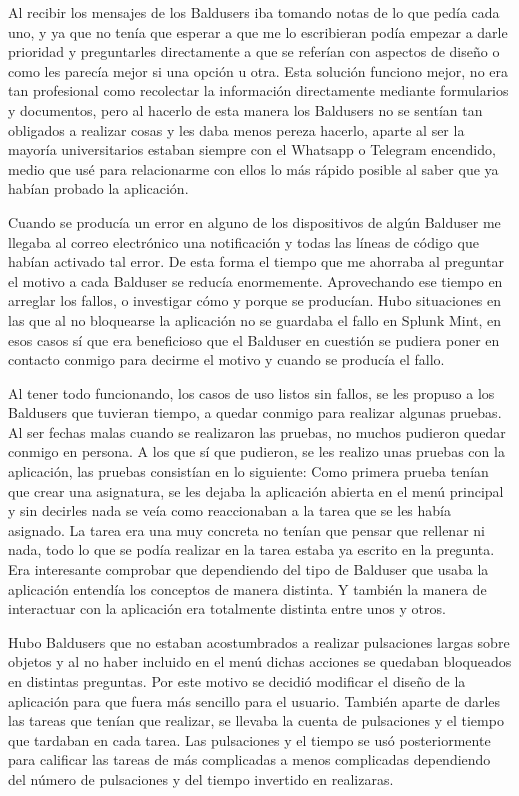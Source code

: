 Al recibir los mensajes de los Baldusers iba tomando notas de lo que pedía cada uno, y ya que no tenía que esperar a que me lo escribieran podía empezar a darle prioridad y preguntarles directamente a que se referían con aspectos de diseño o como les parecía mejor si una opción u otra.
Esta solución funciono mejor, no era tan profesional como recolectar la información directamente mediante formularios y documentos, pero al hacerlo de esta manera los Baldusers no  se sentían tan obligados a realizar cosas y les daba menos pereza hacerlo, aparte al ser la mayoría universitarios estaban siempre con el Whatsapp o Telegram encendido, medio que usé para relacionarme con ellos lo más rápido posible al saber que ya habían probado la aplicación.

Cuando se producía un error en alguno de los dispositivos de algún Balduser me llegaba al correo electrónico una notificación y todas las líneas de código que habían activado tal error.
De esta forma el tiempo que me ahorraba al preguntar el motivo a cada Balduser se reducía enormemente.
Aprovechando ese tiempo en arreglar los fallos, o investigar cómo y porque se producían.
Hubo situaciones en las que al no bloquearse la aplicación no se guardaba el fallo en Splunk Mint\cite{SplunkMint}, en esos casos sí que era beneficioso que el Balduser en cuestión se pudiera poner en contacto conmigo para decirme el motivo y cuando se producía el fallo.

Al tener todo funcionando, los casos de uso listos sin fallos, se les propuso a los Baldusers que tuvieran tiempo, a quedar conmigo para realizar algunas pruebas.
Al ser fechas malas cuando se realizaron las pruebas, no muchos pudieron quedar conmigo en persona. A los que sí que pudieron, se les realizo unas pruebas con la aplicación, las pruebas consistían en lo siguiente:
Como primera prueba tenían que crear una asignatura, se les dejaba la aplicación abierta en el menú principal y sin decirles nada se veía como reaccionaban a la tarea que se les había asignado. La tarea era una muy concreta no tenían que pensar que rellenar ni nada, todo lo que se podía realizar en la tarea estaba ya escrito en la pregunta.
Era interesante comprobar que dependiendo del tipo de Balduser que usaba la aplicación entendía los conceptos de manera distinta. Y también la manera de interactuar con la aplicación era totalmente distinta entre unos y otros.

Hubo Baldusers que no estaban acostumbrados a realizar pulsaciones largas sobre objetos y al no haber incluido en el menú dichas acciones se quedaban bloqueados en distintas preguntas.
Por este motivo se decidió modificar el diseño de la aplicación para que fuera más sencillo para el usuario.
También aparte de darles las tareas que tenían que realizar, se llevaba la cuenta de pulsaciones y el tiempo que tardaban en cada tarea.
Las pulsaciones y el tiempo se usó posteriormente para calificar las tareas de más complicadas a menos complicadas dependiendo del número de pulsaciones y del tiempo invertido en realizaras.

